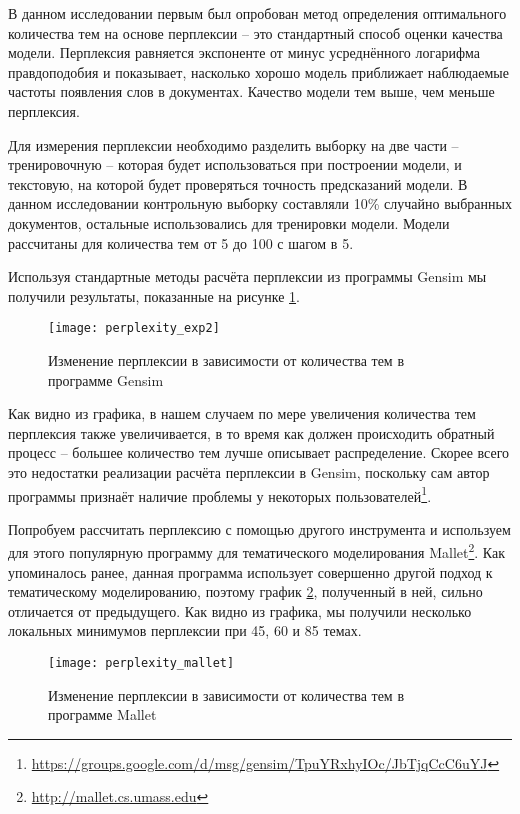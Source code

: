 В данном исследовании первым был опробован метод определения оптимального количества тем на основе перплексии -- это стандартный способ оценки качества модели. Перплексия равняется экспоненте от минус усреднённого логарифма правдоподобия и показывает, насколько хорошо модель приближает наблюдаемые частоты появления слов в документах. Качество модели тем выше, чем меньше перплексия.

Для измерения перплексии необходимо разделить выборку на две части -- тренировочную -- которая будет использоваться при построении модели, и текстовую, на которой будет проверяться точность предсказаний модели. В данном исследовании контрольную выборку составляли 10\% случайно выбранных документов, остальные использовались для тренировки модели. Модели рассчитаны для количества тем от 5 до 100 с шагом в 5.

Используя стандартные методы расчёта перплексии из программы Gensim мы получили результаты, показанные на рисунке \ref{fig:perplexity_gensim}.

\begin{figure}
	\centering
    \texttt{[image: perplexity\_exp2]}
    \caption{Изменение перплексии в зависимости от количества тем в программе Gensim}
    \label{fig:perplexity_gensim}
\end{figure}

Как видно из графика, в нашем случаем по мере увеличения количества тем перплексия также увеличивается, в то время как должен происходить обратный процесс -- большее количество тем лучше описывает распределение. Скорее всего это недостатки реализации расчёта перплексии в Gensim, поскольку сам автор программы признаёт наличие проблемы у некоторых пользователей\footnote{\href{https://groups.google.com/d/msg/gensim/TpuYRxhyIOc/JbTjqCcC6uYJ}{https://groups.google.com/d/msg/gensim/TpuYRxhyIOc/JbTjqCcC6uYJ}}.

Попробуем рассчитать перплексию с помощью другого инструмента и используем для этого популярную программу для тематического моделирования Mallet\footnote{\href{http://mallet.cs.umass.edu}{http://mallet.cs.umass.edu}}. Как упоминалось ранее, данная программа использует совершенно другой подход к тематическому моделированию, поэтому график \ref{fig:perplexity_mallet}, полученный в ней, сильно отличается от предыдущего. Как видно из графика, мы получили несколько локальных минимумов перплексии при 45, 60 и 85 темах.

\begin{figure}
	\centering
    \texttt{[image: perplexity\_mallet]}
    \caption{Изменение перплексии в зависимости от количества тем в программе Mallet}
    \label{fig:perplexity_mallet}
\end{figure}

